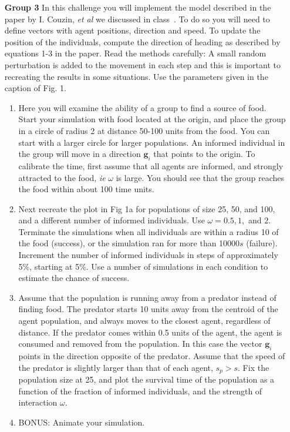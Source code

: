 \documentclass[12pt]{article}
\begin{document}
\begin{enumerate}
\item[\bf Group 3] In this challenge you will implement the model described in the paper by I. Couzin, \emph{et al} we
discussed in class~\cite{couzin05}. To do so you will need to define vectors with agent positions, direction and speed.  
To update the position of the individuals, compute the direction of heading as described by equations 1-3 in
the paper. Read the methods carefully: A small random perturbation is added to the movement in each step and this is important
to recreating the results in some situations. 
Use the parameters given in the caption of Fig. 1.
\
 \begin{enumerate}
 \item Here you will examine the ability of a group to find a source of food.  Start your simulation with food
 located at the origin, and place the group in a circle of radius 2 at distance 50-100 units from the food.  You can
 start with a larger circle for larger populations.  An informed individual in the group will move in a direction
 ${\mathbf g}_i$ that points to the origin. To calibrate the time, first assume that all agents are informed,
 and strongly attracted to the food, \emph{ie} $\omega$ is large. You should see that the group reaches the food within about 
 100 time units. 
 \item Next recreate the plot in Fig 1a for populations of size 25, 50, and 100, and a different number of informed
 individuals.  Use $\omega = 0.5, 1,$ and $2$.  Terminate the simulations when all individuals are within a radius 10 of the food
 (success), or the simulation ran for more than 10000$s$ (failure).  Increment the number of informed individuals in steps of 
 approximately  5\%, starting at  5\%.  Use a number of simulations in each condition to estimate the chance of success.
 \item Assume that the population is running away from a predator instead of finding food.  The predator starts 10 units away from the centroid of the agent population, and always moves to the closest
 agent, regardless of distance. If the predator comes within 0.5 units of the agent, the agent is consumed and removed from the population.  In this case the vector  ${\mathbf g}_i$ points in the 
 direction opposite of the predator.  Assume that the speed of the predator  is 
 slightly larger than that of each agent,  $s_p > s$. Fix the population size at 25, and plot the survival time
  of the population as a function of the fraction of informed individuals, and the strength of interaction $\omega$.   
 \item BONUS: Animate your simulation.
 \end{enumerate}
 

\end{enumerate}
\end{document}
